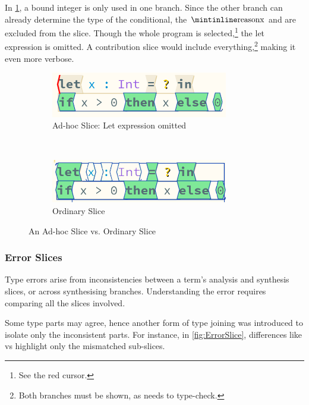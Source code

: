 In \cref{fig:LetSliceOmitted}, a bound integer  is only used in one branch. Since the other branch can already determine the type of the conditional, the $\code{x}$  and  are excluded from the slice. Though the whole program is selected,\footnote{See the red cursor.} the let expression is omitted. A contribution slice would include everything,\footnote{Both branches must be shown, as  needs to type-check.} making it even more verbose.
\begin{figure}
\centering
\begin{subfigure}{0.45\textwidth}
\centering

\includegraphics[width=0.85\textwidth]{Media/Figures/Unused_let}
\caption{Ad-hoc Slice: Let expression omitted}
\end{subfigure}$\qquad$
\begin{subfigure}{0.45\textwidth}
\centering

\includegraphics[width=0.85\textwidth]{Media/Figures/Unused_let_ordinary}
\caption{Ordinary Slice}
\end{subfigure}

\caption{An Ad-hoc Slice vs. Ordinary Slice}
\label{fig:LetSliceOmitted}
\end{figure}


\subsubsection{Error Slices}
Type errors arise from inconsistencies between a term’s analysis and synthesis slices, or across synthesising branches. Understanding the error requires comparing all the slices involved.

Some type parts may agree, hence another form of type joining was introduced to isolate only the inconsistent parts. For instance, in \cref{fig:ErrorSlice}, differences like  vs  highlight only the mismatched sub-slices.


